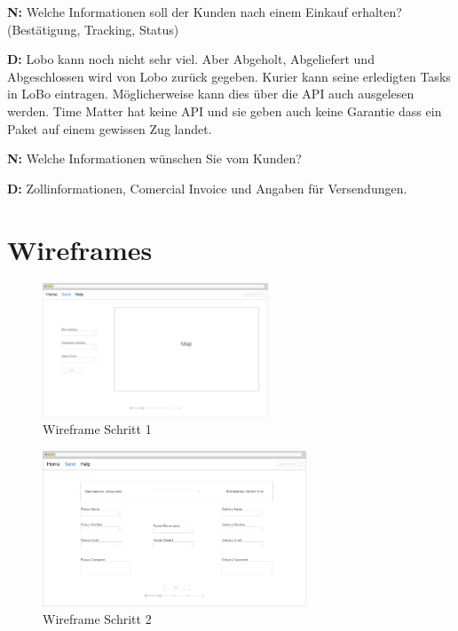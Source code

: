 \textbf{N:} Welche Informationen soll der Kunden nach einem Einkauf erhalten? (Bestätigung, Tracking, Status)

\textbf{D:} Lobo kann noch nicht sehr viel. Aber Abgeholt, Abgeliefert und Abgeschlossen wird von Lobo zurück gegeben. Kurier kann seine erledigten Tasks in LoBo eintragen. Möglicherweise kann dies über die API auch ausgelesen werden. Time Matter hat keine API und sie geben auch keine Garantie dass ein Paket auf einem gewissen Zug landet.

\textbf{N:} Welche Informationen wünschen Sie vom Kunden?

\textbf{D:} Zollinformationen, Comercial Invoice und Angaben für Versendungen.

\newpage{}
\section{Wireframes}
\label{sec:anhangwireframes}

\begin{figure}[ht]
  \centering
  \includegraphics[angle=270,width=0.6\textwidth]{images/step1.png}
  \caption{Wireframe Schritt 1}
  \label{fig:wireframes1}
\end{figure}

\begin{figure}[ht]
  \centering
  \includegraphics[angle=270,width=0.7\textwidth]{images/step2.png}
  \caption{Wireframe Schritt 2}
  \label{fig:wireframes2}
\end{figure}

